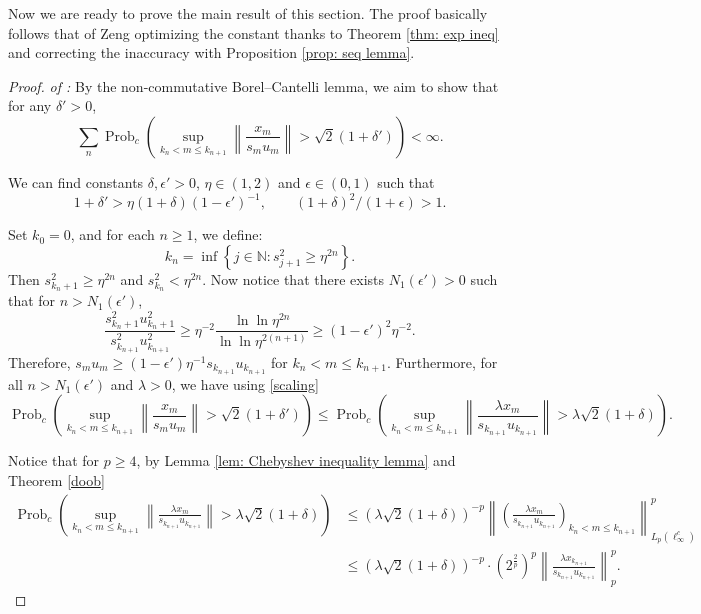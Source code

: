 \documentclass[10pt]{amsart}
\theoremstyle{definition}
\theoremstyle{myremark}
\numberwithin{equation}{section}
\begin{document}
Now we are ready to prove the main result of this section. The proof basically follows that of Zeng \cite{zeng2015kolmogorov} optimizing  the constant thanks to Theorem \ref{thm: exp ineq} and correcting the inaccuracy with Proposition \ref{prop: seq lemma}. 
\begin{proof}
\emph{of :}
  By the non-commutative Borel–Cantelli lemma, we aim to show that for any $\delta'>0$, 
 $$\sum_n \operatorname{Prob}_c\left( \sup_{k_n < m \le k_{n+1}} \left\| \frac{x_m}{s_m u_m} \right\| > \sqrt 2 (1+ \delta') \right)<\infty.$$
  
  We can find constants $\delta , \epsilon' > 0$,  $\eta \in (1,2)$ and $\epsilon\in (0,1)$ such that
\begin{equation}\label{epscond}
  1 + \delta' > \eta(1 + \delta)(1 - \epsilon')^{-1}, \qquad (1 + \delta)^2 / (1 + \epsilon) > 1. 
\end{equation}

    Set $k_0 = 0$, and for each $n \geq 1$, we define:
    $$
    k_n = \inf \left\{ j \in \mathbb{N} : s_{j+1}^2 \ge \eta^{2n} \right\}.
    $$
    Then $s^2_{k_n+1} \ge \eta^{2n}$ and $s^2_{k_n} < \eta^{2n}$. Now notice that there exists $N_1(\epsilon') > 0$ such that for $n > N_1(\epsilon')$,
    $$
    \frac{s^2_{k_n+1}u^2_{k_n+1}}{s^2_{k_{n+1}}u^2_{k_{n+1}}} \ge \eta^{-2} \frac{\ln \ln \eta^{2n}}{\ln \ln \eta^{2(n+1)}} \ge \left(1 - \epsilon'\right)^2 \eta^{-2}.
    $$
    Therefore, $s_m u_m \ge (1 - \epsilon')\eta^{-1}s_{k_{n+1}}u_{k_{n+1}}$ for $k_n < m \le k_{n+1}$. Furthermore, for all $n > N_1(\epsilon')$ and $\lambda>0$, we have using \eqref{scaling}
    \begin{equation}\label{eq: x_m and x_n ineq}
        \operatorname{Prob}_c\left( \sup_{k_n < m \le k_{n+1}} \left\| \frac{x_m}{s_m u_m} \right\| > \sqrt2(1 + \delta') \right)
    \le \operatorname{Prob}_c\left( \sup_{k_n < m \le k_{n+1}} \left\| \frac{\lambda x_m}{s_{k_{n+1}} u_{k_{n+1}}} \right\| > \lambda \sqrt 2(1 + \delta) \right).
    \end{equation}
    
    Notice that for $p \ge 4$, by Lemma \ref{lem: Chebyshev inequality lemma} and Theorem \ref{doob}
    \begin{align*}
    \operatorname{Prob}_c\left( \sup_{k_n < m \le k_{n+1}} \left\| \frac{\lambda x_m}{s_{k_{n+1}} u_{k_{n+1}}} \right\| > \lambda \sqrt2(1 + \delta) \right)
    &\le \left( \lambda \sqrt2(1 + \delta) \right)^{-p} \left\| \left( \frac{\lambda x_m}{s_{k_{n+1}} u_{k_{n+1}}} \right)_{k_n < m \le k_{n+1}} \right\|^p_{L_p(\ell_\infty^c)}\\
    &\le \left( \lambda \sqrt2(1 + \delta) \right)^{-p} \cdot \left(2^\frac{2}{p}\right)^p \left\| \frac{\lambda x_{k_{n+1}}}{s_{k_{n+1}} u_{k_{n+1}}} \right\|^p_p.
    \end{align*}
    

\end{proof}
\end{document}
